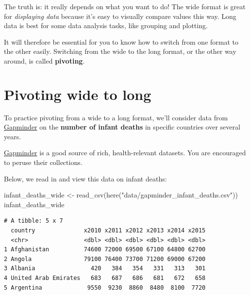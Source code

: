 \documentclass[
  letterpaper,
  DIV=11,
  numbers=noendperiod]{scrreprt}
\newenvironment{Shaded}{\begin{snugshade}}{\end{snugshade}}
\newcommand{\FunctionTok}[1]{\textcolor[rgb]{0.28,0.35,0.67}{#1}}
\newcommand{\NormalTok}[1]{\textcolor[rgb]{0.00,0.23,0.31}{#1}}
\newcommand{\OtherTok}[1]{\textcolor[rgb]{0.00,0.23,0.31}{#1}}
\newcommand{\StringTok}[1]{\textcolor[rgb]{0.13,0.47,0.30}{#1}}
\begin{document}
The truth is: it really depends on what you want to do! The wide format
is great for \emph{displaying data} because it's easy to visually
compare values this way. Long data is best for some data analysis tasks,
like grouping and plotting.

It will therefore be essential for you to know how to switch from one
format to the other easily. Switching from the wide to the long format,
or the other way around, is called \textbf{pivoting}.

\section{Pivoting wide to long}\label{pivoting-wide-to-long}

To practice pivoting from a wide to a long format, we'll consider data
from \href{https://www.gapminder.org}{Gapminder} on the \textbf{number
of infant deaths} in specific countries over several years.

\begin{tcolorbox}[enhanced jigsaw, title=\textcolor{quarto-callout-note-color}{\faInfo}\hspace{0.5em}{Side Note}, colbacktitle=quarto-callout-note-color!10!white, leftrule=.75mm, arc=.35mm, opacityback=0, bottomrule=.15mm, rightrule=.15mm, toptitle=1mm, breakable, toprule=.15mm, colback=white, coltitle=black, colframe=quarto-callout-note-color-frame, bottomtitle=1mm, titlerule=0mm, left=2mm, opacitybacktitle=0.6]

\href{https://www.gapminder.org}{Gapminder} is a good source of rich,
health-relevant datasets. You are encouraged to peruse their
collections.

\end{tcolorbox}

Below, we read in and view this data on infant deaths:

\begin{Shaded}
\begin{Highlighting}[]
\NormalTok{infant\_deaths\_wide }\OtherTok{\textless{}{-}} \FunctionTok{read\_csv}\NormalTok{(}\FunctionTok{here}\NormalTok{(}\StringTok{"data/gapminder\_infant\_deaths.csv"}\NormalTok{))}
\NormalTok{infant\_deaths\_wide}
\end{Highlighting}
\end{Shaded}

\begin{verbatim}
# A tibble: 5 x 7
  country              x2010 x2011 x2012 x2013 x2014 x2015
  <chr>                <dbl> <dbl> <dbl> <dbl> <dbl> <dbl>
1 Afghanistan          74600 72000 69500 67100 64800 62700
2 Angola               79100 76400 73700 71200 69000 67200
3 Albania                420   384   354   331   313   301
4 United Arab Emirates   683   687   686   681   672   658
5 Argentina             9550  9230  8860  8480  8100  7720
\end{verbatim}
\end{document}
